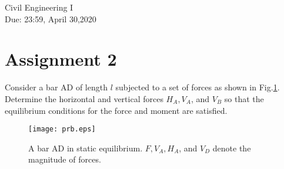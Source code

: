 \documentclass[10pt,a4j]{article}
\newlength{\minitwocolumn}
\begin{document}
\newcommand{\fat}[1]{\mbox{\boldmath $#1$}}
\newcommand{\D}{\partial}
\newcommand{\w}{\omega}
\newcommand{\ga}{\alpha}
\newcommand{\gb}{\beta}
\newcommand{\gx}{\xi}
\newcommand{\gz}{\zeta}
\newcommand{\vhat}[1]{\hat{\fat{#1}}}
\newcommand{\spc}{\vspace{0.7\baselineskip}}
\newcommand{\halfspc}{\vspace{0.3\baselineskip}}

\newcommand{\twofig}[2]
 {
   \begin{figure}
     \begin{minipage}[t]{\minitwocolumn}
         \begin{center}   #1
         \end{center}
     \end{minipage}
         \hspace{\columnsep}
     \begin{minipage}[t]{\minitwocolumn}
         \begin{center} #2
         \end{center}
     \end{minipage}
   \end{figure}
 }
\begin{flushright}
	{Civil Engineering I \\ 
	Due: 23:59, April 30,2020
	}
\end{flushright}
\hspace{10mm}
\section*{Assignment 2}
Consider a bar AD of length $l$ subjected to a set of forces 
as shown in Fig.\ref{fig:prb}.
Determine the horizontal and vertical forces $H_A, V_A$, and $V_B$ 
so that the equilibrium conditions for the force and moment are satisfied. 
    \begin{figure}[h]
        \begin{center}
        \texttt{[image: prb.eps]} 
        \end{center}
        \caption{A bar AD in static equilibrium. $F, V_A, H_A$, and 
	    $V_D$ denote the magnitude of forces.} 
        \label{fig:prb}
    \end{figure}
\end{document}
